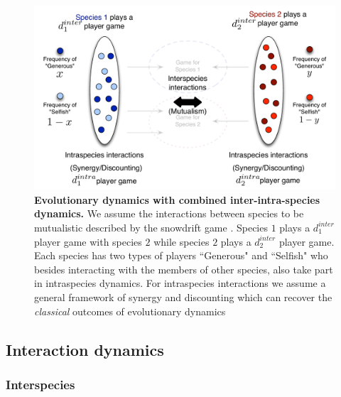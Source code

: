 \documentclass[12pt]{article}
\begin{document}
\begin{figure}
\begin{center}
\includegraphics[scale=0.5]{Figures/interintra.pdf}
\caption{\small{
\textbf{Evolutionary dynamics with combined inter-intra-species dynamics.}
We assume the interactions between species to be mutualistic described by the snowdrift game \citep{bergstrom:PNAS:2003,souza:JTB:2009,gokhale:PRSB:2012}.
Species $1$ plays a $d_1^{inter}$ player game with species $2$ while species $2$ plays a $d_2^{inter}$ player game.
Each species has two types of players ``Generous" and ``Selfish" who besides interacting with the members of other species, also take part in intraspecies dynamics.
For intraspecies interactions we assume a general framework of synergy and discounting which can recover the \textit{classical} outcomes of evolutionary dynamics\citep{eshel:AmNat:1988,hauert:JTB:2006a,nowak:book:2006}
}
\label{fig:conceptart}
}
\end{center}
\end{figure}


\subsection{Interaction dynamics}
\subsubsection{Interspecies}
\end{document}

